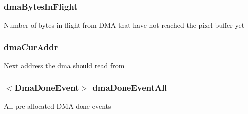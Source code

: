 \label{classHDLcd_a8ff8f961eef85324f222954cc8ba53ee}
\hypertarget{classHDLcd_afea33d6bd5ce3008fa372e08f27ca95e}{
\subsubsection[{dmaBytesInFlight}]{ {\bf dmaBytesInFlight}}}
\label{classHDLcd_afea33d6bd5ce3008fa372e08f27ca95e}
Number of bytes in flight from DMA that have not reached the pixel buffer yet \hypertarget{classHDLcd_afff19aa29c60ac58e1bfa8689c58b923}{
\subsubsection[{dmaCurAddr}]{ {\bf dmaCurAddr}}}
\label{classHDLcd_afff19aa29c60ac58e1bfa8689c58b923}
Next address the dma should read from \hypertarget{classHDLcd_aa50a0179a2d530a0a45d74b014c425fe}{
\subsubsection[{dmaDoneEventAll}]{$<${\bf DmaDoneEvent}$>$ {\bf dmaDoneEventAll}}}
\label{classHDLcd_aa50a0179a2d530a0a45d74b014c425fe}
All pre-\/allocated DMA done events

